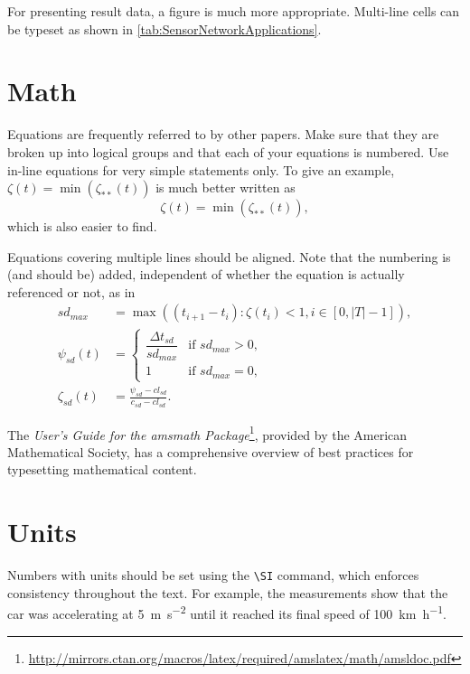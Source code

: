 \documentclass[]{ccs-thesis}
\begin{document}
{For presenting result data, a figure is much more appropriate.
Multi-line cells can be typeset as shown in \cref{tab:SensorNetworkApplications}.

\clearpage
\section{Math}

Equations are frequently referred to by other papers.
Make sure that they are broken up into logical groups and that each of your equations is numbered.
Use in-line equations for very simple statements only.
To give an example, $\zeta(t) = \min( \zeta_{**}(t))$ is much better written as
\begin{equation}\label{eq:zeta}
\zeta(t) =
	\min\left(
		\zeta_{**}(t)
	\right)
,
\end{equation}
which is also easier to find.

Equations covering multiple lines should be aligned.
Note that the numbering is (and should be) added, independent of whether the equation is actually referenced or not, as in
\begin{align}
sd_{max} &=
	\max\left(
		(t_{i+1} - t_i)
			: \zeta(t_i) < 1, i \in [0, |T|-1]
	\right)
,\\
\psi_{sd}(t) &=
	\begin{cases}
		\dfrac{\Delta t_{sd}}{sd_{max}}
			& \text{if $sd_{max} > 0$}, \\
		1
			& \text{if $sd_{max} = 0$},
	\end{cases}
\\
\zeta_{sd}(t) &= 
	\frac{
		\psi_{sd} - cl_{sd}
	}{
		c_{sd} - cl_{sd}
	}
.
\end{align}

The \emph{User's Guide for the amsmath Package}\footnote{\url{http://mirrors.ctan.org/macros/latex/required/amslatex/math/amsldoc.pdf}}, provided by the American Mathematical Society, has a comprehensive overview of best practices for typesetting mathematical content.


\clearpage
\section{Units}

Numbers with units should be set using the \verb|\SI| command, which enforces consistency throughout the text.
For example, the measurements show that the car was accelerating at \SI{5}{\metre\per\second\squared} until it reached its final speed of \SI{100}{\kilo\metre\per\hour}.

}
\end{document}
